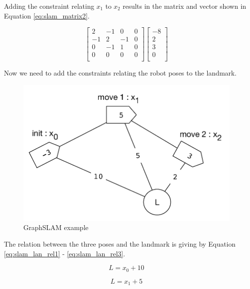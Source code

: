Adding the constraint relating $x_1$ to $x_2$ results in the matrix and vector shown in Equation \ref{eq:slam_matrix2}.

\begin{equation}
\label{eq:slam_matrix2}
\begin{bmatrix}
2 & -1 & 0 & 0 \\
-1 & 2 & -1 & 0 \\
0 & -1 & 1 & 0 \\
0 & 0 & 0 & 0 \\
\end{bmatrix}
\begin{bmatrix}
-8 \\
2 \\
3 \\
0 \\
\end{bmatrix}
\end{equation}

Now we need to add the constraints relating the robot poses to the landmark.

\begin{figure}[H]
\centering
\includegraphics[scale=0.70]{images/ex_slam_graph}
\caption{GraphSLAM example}
\label{fig:slam_ex}
\end{figure}

The relation between the three poses and the landmark is giving by Equation \ref{eq:slam_lan_rel1} - \ref{eq:slam_lan_rel3}.

\begin{equation}
\label{eq:slam_lan_rel1}
L = x_0 + 10
\end{equation}

\begin{equation}
\label{eq:slam_lan_rel2}
L = x_1 + 5
\end{equation}

